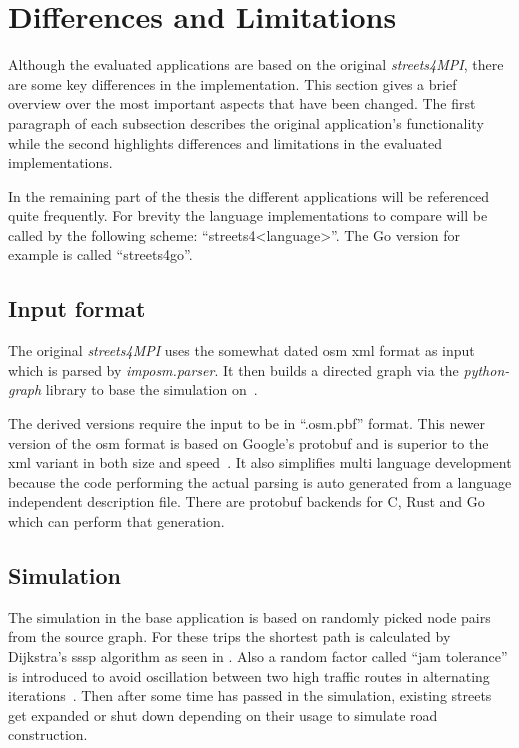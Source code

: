 \section{Differences and Limitations}
\label{sec:Concept::Differences}

Although the evaluated applications are based on the original \textit{streets4MPI}, there are some key differences in the implementation. This section gives a brief overview over the most important aspects that have been changed. The first paragraph of each subsection describes the original application's functionality while the second highlights differences and limitations in the evaluated implementations.

In the remaining part of the thesis the different applications will be referenced quite frequently. For brevity the language implementations to compare will be called by the following scheme: ``streets4<language>''. The Go version for example is called ``streets4go''.

\subsection*{Input format}
\label{subsec:Concept::Differences::Input}

The original \textit{streets4MPI} uses the somewhat dated \gls{osm} \gls{xml} format as input which is parsed by \textit{imposm.parser}. It then builds a directed graph via the \textit{python-graph} library to base the simulation on~\cite{streets_report}.

The derived versions require the input to be in ``.osm.pbf'' format. This newer version of the \gls{osm} format is based on Google's \gls{protobuf} and is superior to the \gls{xml} variant in both size and speed~\cite{osm_wiki_pbf}. It also simplifies multi language development because the code performing the actual parsing is auto generated from a language independent description file. There are \gls{protobuf} backends for C, Rust and Go which can perform that generation.

\subsection*{Simulation}
\label{subsec:Concept::Differences::Simulation}

The simulation in the base application is based on randomly picked node pairs from the source graph. For these trips the shortest path is calculated by Dijkstra's \gls{sssp} algorithm as seen in \cite{cormen}. Also a random factor called ``jam tolerance'' is introduced to avoid oscillation between two high traffic routes in alternating iterations~\cite{streets_report}. Then after some time has passed in the simulation, existing streets get expanded or shut down depending on their usage to simulate road construction.

